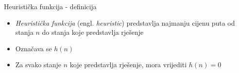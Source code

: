 \documentclass{beamer}
\newcommand{\engl}[1]{ (engl. \emph{#1})}
\newcommand{\state}[2]{\textsc{Stanje}(\( #1 \), \( #2 \))}
\newcommand{\actionName}[1]{#1}
\newcommand{\downAction}{\actionName{Dolje}}
\newcommand{\leftAction}{\actionName{Lijevo}}
\newcommand{\rightAction}{\actionName{Desno}}
\begin{document}
%
%			
%
%

  \begin{frame}{Heuristička funkcija - definicija}
  	\begin{itemize}
  	  \item \emph{Heuristička funkcija} \engl{heuristic} predstavlja najmanju cijenu puta od stanja \( n \) do stanja koje predstavlja rješenje
  	  \item Označava se \( h(n) \)
  	  \item Za svako stanje \( n \) koje predstavlja rješenje, mora vrijediti \( h(n) = 0 \)
  	\end{itemize}
  \end{frame}
\end{document}
